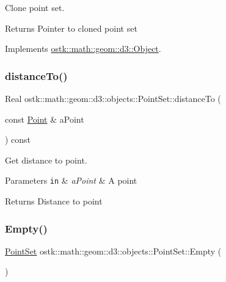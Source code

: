 Clone point set. 

\begin{DoxyReturn}{Returns}
Pointer to cloned point set 
\end{DoxyReturn}


Implements \hyperlink{classostk_1_1math_1_1geom_1_1d3_1_1_object_a676013f9555f6492687f9809b2db887b}{ostk\+::math\+::geom\+::d3\+::\+Object}.

\mbox{\label{classostk_1_1math_1_1geom_1_1d3_1_1objects_1_1_point_set_ad46f8b9e6d9f9b256fe1d0104f266968}} 
\subsubsection{\texorpdfstring{distance\+To()}{distanceTo()}}
{\footnotesize\ttfamily Real ostk\+::math\+::geom\+::d3\+::objects\+::\+Point\+Set\+::distance\+To (\begin{DoxyParamCaption}\item[{const \hyperlink{classostk_1_1math_1_1geom_1_1d3_1_1objects_1_1_point}{Point} \&}]{a\+Point }\end{DoxyParamCaption}) const}



Get distance to point. 


\begin{DoxyParams}[1]{Parameters}
\mbox{\tt in}  & {\em a\+Point} & A point \\
\hline
\end{DoxyParams}
\begin{DoxyReturn}{Returns}
Distance to point 
\end{DoxyReturn}
\mbox{\label{classostk_1_1math_1_1geom_1_1d3_1_1objects_1_1_point_set_a1b14ed7d73ee7ac5e2796cf44f06ffe9}} 
\subsubsection{\texorpdfstring{Empty()}{Empty()}}
{\footnotesize\ttfamily \hyperlink{classostk_1_1math_1_1geom_1_1d3_1_1objects_1_1_point_set}{Point\+Set} ostk\+::math\+::geom\+::d3\+::objects\+::\+Point\+Set\+::\+Empty (\begin{DoxyParamCaption}{ }\end{DoxyParamCaption})\hspace{0.3cm}{\ttfamily [static]}}



